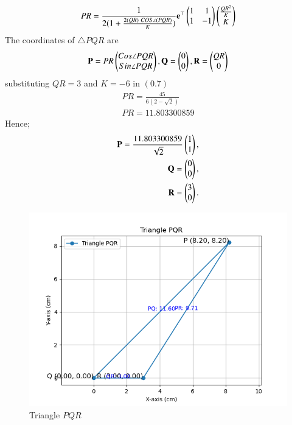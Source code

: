 \documentclass[journal]{IEEEtran}
\begin{document}
\begin{align}
    PR = \frac{1}{2(1+\frac{2(QR)\ COS \angle(PQR)}{K})} \Vec{e}^\top \myvec{1 &1\\ 1 & -1} \myvec{\frac{QR^2}{K}\\ K}
\end{align}
The coordinates of $\triangle PQR$ are
\begin{align}
    \mathbf P = PR \begin{pmatrix}Cos\angle PQR\\ Sin \angle PQR\end{pmatrix} , \mathbf Q = \begin{pmatrix}0 \\ 0\end{pmatrix} , \mathbf R = \begin{pmatrix}QR \\ 0\end{pmatrix}
\end{align}
substituting $QR = 3$ and $K=-6$ in $(0.7)$
\begin{align}
    PR = \frac{45}{6(2-\sqrt{2})}\\
    PR = 11.803300859
\end{align}
Hence;
\begin{align}
    \mathbf{P} = \frac{11.803300859}{\sqrt{2}} \begin{pmatrix}1 \\ 1\end{pmatrix}, \\
    \mathbf{Q} = \begin{pmatrix}0 \\ 0\end{pmatrix}, \\
    \mathbf{R} = \begin{pmatrix}3 \\ 0\end{pmatrix}.
\end{align}
\begin{figure}[h!]
   \centering
   \includegraphics[width=0.7\linewidth]{figs/triangle_plot.png}
   \caption{Triangle $PQR$}
\end{figure}
\end{document}
